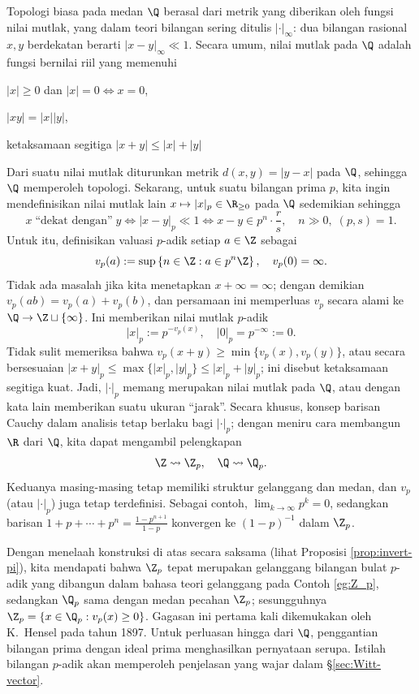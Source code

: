 \begin{example}\label{eg:p-adic-valuation} 
	Topologi biasa pada medan $\Q$ berasal dari metrik yang diberikan oleh fungsi nilai mutlak, yang dalam teori bilangan sering ditulis $|\cdot|_\infty$: dua bilangan rasional $x,y$ berdekatan berarti $|x-y|_\infty \ll 1$. Secara umum, nilai mutlak pada $\Q$ adalah fungsi bernilai riil yang memenuhi
	\begin{inparaenum}[(a)]
		\item $|x| \geq 0$ dan $|x|=0 \iff x=0$,
		\item $|xy|=|x| |y|$,
		\item ketaksamaan segitiga $|x+y| \leq |x|+|y|$
	\end{inparaenum}
	Dari suatu nilai mutlak diturunkan metrik $d(x,y)=|y-x|$ pada $\Q$, sehingga $\Q$ memperoleh topologi. Sekarang, untuk suatu bilangan prima $p$, kita ingin mendefinisikan nilai mutlak lain $x \mapsto |x|_p \in \R_{\geq 0}$ pada $\Q$ sedemikian sehingga
	\[ x \;\text{``dekat dengan''}\; y \iff |x-y|_p \ll 1 \iff x-y \in  p^n \cdot \frac{r}{s}, \quad n \gg 0, \; (p,s)=1. \]
	Untuk itu, definisikan valuasi $p$-adik setiap $a \in \Z$ sebagai
	\[ v_p(a) := \sup \left\{n \in \Z: a \in p^n \Z  \right\},\quad v_p(0) = \infty. \]
	Tidak ada masalah jika kita menetapkan $x + \infty = \infty$; dengan demikian $v_p(ab) = v_p(a) + v_p(b)$, dan persamaan ini memperluas $v_p$ secara alami ke $\Q \to \Z \sqcup \{\infty\}$. Ini memberikan nilai mutlak $p$-adik
	\[ |x|_p := p^{-v_p(x)}, \quad |0|_p = p^{-\infty} := 0. \]
	Tidak sulit memeriksa bahwa $v_p(x+y) \geq \min\{v_p(x), v_p(y)\}$, atau secara bersesuaian $|x+y|_p \leq \max\{|x|_p , |y|_p\} \leq |x|_p + |y|_p$; ini disebut ketaksamaan segitiga kuat. Jadi, $|\cdot|_p$ memang merupakan nilai mutlak pada $\Q$, atau dengan kata lain memberikan suatu ukuran ``jarak''. Secara khusus, konsep barisan Cauchy dalam analisis tetap berlaku bagi $|\cdot|_p$; dengan meniru cara membangun $\R$ dari $\Q$, kita dapat mengambil pelengkapan
	\begin{gather*}
		\Z \leadsto \Z_p, \quad	\Q \leadsto \Q_p.
	\end{gather*}
	Keduanya masing-masing tetap memiliki struktur gelanggang dan medan, dan $v_p$ (atau $|\cdot|_p$) juga tetap terdefinisi. Sebagai contoh, $\lim_{k \to \infty} p^k = 0$, sedangkan barisan $1 + p + \cdots + p^n = \frac{1 - p^{n+1}}{1 - p}$ konvergen ke $(1-p)^{-1}$ dalam $\Z_p$.

	Dengan menelaah konstruksi di atas secara saksama (lihat Proposisi \ref{prop:invert-pi}), kita mendapati bahwa $\Z_p$ tepat merupakan gelanggang bilangan bulat $p$-adik yang dibangun dalam bahasa teori gelanggang pada Contoh \ref{eg:Z_p}, sedangkan $\Q_p$ sama dengan medan pecahan $\Z_p$; sesungguhnya $\Z_p = \{x \in \Q_p: v_p(x) \geq 0 \}$. Gagasan ini pertama kali dikemukakan oleh K.\ Hensel pada tahun 1897. Untuk perluasan hingga dari $\Q$, penggantian bilangan prima dengan ideal prima menghasilkan pernyataan serupa. Istilah bilangan $p$-adik akan memperoleh penjelasan yang wajar dalam \S\ref{sec:Witt-vector}.
\end{example}

